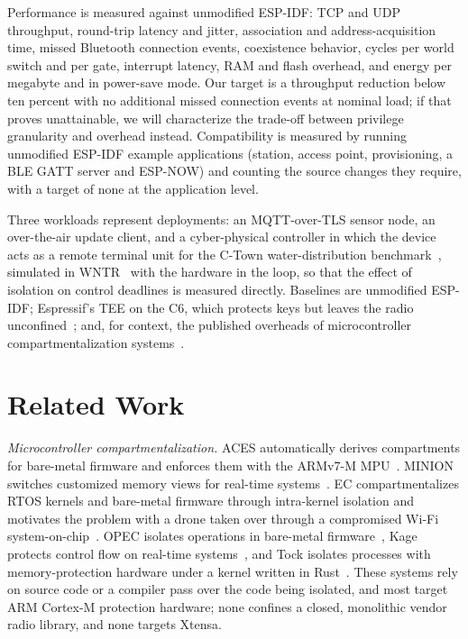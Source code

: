 \documentclass[conference,10pt]{IEEEtran}
\begin{document}
Performance is measured against unmodified ESP-IDF: TCP and UDP throughput, round-trip latency and jitter, association and address-acquisition time, missed Bluetooth connection events, coexistence behavior, cycles per world switch and per gate, interrupt latency, RAM and flash overhead, and energy per megabyte and in power-save mode. Our target is a throughput reduction below ten percent with no additional missed connection events at nominal load; if that proves unattainable, we will characterize the trade-off between privilege granularity and overhead instead. Compatibility is measured by running unmodified ESP-IDF example applications (station, access point, provisioning, a BLE GATT server and ESP-NOW) and counting the source changes they require, with a target of none at the application level.

Three workloads represent deployments: an MQTT-over-TLS sensor node, an over-the-air update client, and a cyber-physical controller in which the device acts as a remote terminal unit for the C-Town water-distribution benchmark~\cite{taormina2018batadal}, simulated in WNTR~\cite{klise2017wntr} with the hardware in the loop, so that the effect of isolation on control deadlines is measured directly. Baselines are unmodified ESP-IDF; Espressif's TEE on the C6, which protects keys but leaves the radio unconfined~\cite{esptee}; and, for context, the published overheads of microcontroller compartmentalization systems~\cite{clements2018aces,khan2023ec}.

\section{Related Work}
\label{sec:related}

\emph{Microcontroller compartmentalization.} ACES automatically derives compartments for bare-metal firmware and enforces them with the ARMv7-M MPU~\cite{clements2018aces}. MINION switches customized memory views for real-time systems~\cite{kim2018minion}. EC compartmentalizes RTOS kernels and bare-metal firmware through intra-kernel isolation and motivates the problem with a drone taken over through a compromised Wi-Fi system-on-chip~\cite{khan2023ec}. OPEC isolates operations in bare-metal firmware~\cite{zhou2022opec}, Kage protects control flow on real-time systems~\cite{du2022kage}, and Tock isolates processes with memory-protection hardware under a kernel written in Rust~\cite{levy2017tock}. These systems rely on source code or a compiler pass over the code being isolated, and most target ARM Cortex-M protection hardware; none confines a closed, monolithic vendor radio library, and none targets Xtensa.
\end{document}
